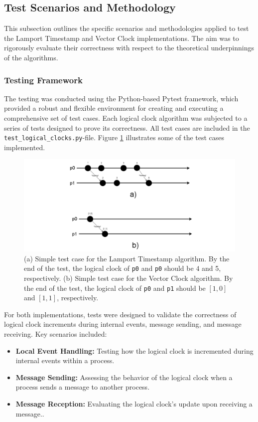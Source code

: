\documentclass{article}
\begin{document}
    \subsection{Test Scenarios and Methodology}
      This subsection outlines the specific scenarios and methodologies applied to test the Lamport Timestamp and Vector Clock implementations. The aim was to rigorously evaluate their correctness with respect to the theoretical underpinnings of the algorithms.
      
      \subsubsection{Testing Framework}
      The testing was conducted using the Python-based Pytest framework, which provided a robust and flexible environment for creating and executing a comprehensive set of test cases. Each logical clock algorithm was subjected to a series of tests designed to prove its correctness. All test cases are included in the \texttt{test\_logical\_clocks.py}-file. Figure \ref{fig:test_cases} illustrates some of the test cases implemented.
      \begin{figure}[h!]
        \centering
        \includegraphics[width=\textwidth]{img/test_cases.png}
        \caption{(a) Simple test case for the Lamport Timestamp algorithm. By the end of the test, the logical clock of \texttt{p0} and \texttt{p0} should be $4$ and 5, respectively. (b) Simple test case for the Vector Clock algorithm. By the end of the test, the logical clock of \texttt{p0} and \texttt{p1} should be $[1,0]$ and $[1,1]$, respectively.}
        \label{fig:test_cases}
      \end{figure}
      
      For both implementations, tests were designed to validate the correctness of logical clock increments during internal events, message sending, and message receiving. Key scenarios included:
      \begin{itemize}
          \item \textbf{Local Event Handling:} Testing how the logical clock is incremented during internal events within a process.
          \item \textbf{Message Sending:} Assessing the behavior of the logical clock when a process sends a message to another process.
          \item \textbf{Message Reception:} Evaluating the logical clock's update upon receiving a message..
      \end{itemize}
      
\end{document}
